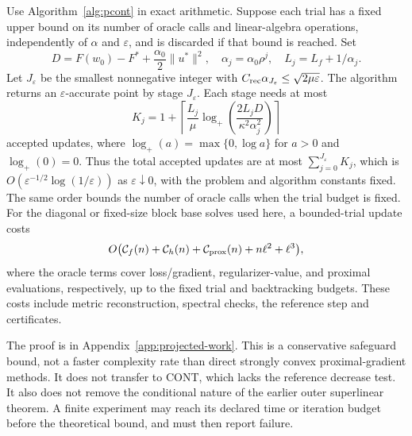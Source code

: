 \begin{theorem}\label{thm:projected-work}
Use Algorithm~\ref{alg:pcont} in exact arithmetic. Suppose each trial has a fixed upper bound on its number of oracle calls and linear-algebra operations, independently of $\alpha$ and $\varepsilon$, and is discarded if that bound is reached. Set
\[
D=F(w_0)-F^*+\frac{\alpha_0}{2}\|u^*\|^2,\quad
\alpha_j=\alpha_0\rho^j,\quad L_j=L_f+1/\alpha_j.
\]
Let $J_\varepsilon$ be the smallest nonnegative integer with $C_{\rm rec}\alpha_{J_\varepsilon}\le\sqrt{2\mu\varepsilon}$. The algorithm returns an $\varepsilon$-accurate point by stage $J_\varepsilon$. Each stage needs at most
\begin{equation}\label{eq:stage-work}
K_j=1+\left\lceil\frac{L_j}{\mu}\log_+\!\left(\frac{2L_jD}{\kappa^2\alpha_j^2}\right)\right\rceil
\end{equation}
accepted updates, where $\log_+(a)=\max\{0,\log a\}$ for $a>0$ and $\log_+(0)=0$. Thus the total accepted updates are at most $\sum_{j=0}^{J_\varepsilon}K_j$, which is
$O(\varepsilon^{-1/2}\log(1/\varepsilon))$ as $\varepsilon\downarrow0$, with the problem and algorithm constants fixed. The same order bounds the number of oracle calls when the trial budget is fixed. For the diagonal or fixed-size block base solves used here, a bounded-trial update costs
\[
O\bigl(\mathcal C_f(n)+\mathcal C_h(n)+\mathcal C_{\rm prox}(n)+n\ell^2+\ell^3\bigr),
\]
where the oracle terms cover loss/gradient, regularizer-value, and proximal evaluations, respectively, up to the fixed trial and backtracking budgets. These costs include metric reconstruction, spectral checks, the reference step and certificates.
\end{theorem}
The proof is in Appendix~\ref{app:projected-work}. This is a conservative safeguard bound, not a faster complexity rate than direct strongly convex proximal-gradient methods. It does not transfer to CONT, which lacks the reference decrease test. It also does not remove the conditional nature of the earlier outer superlinear theorem. A finite experiment may reach its declared time or iteration budget before the theoretical bound, and must then report failure.



